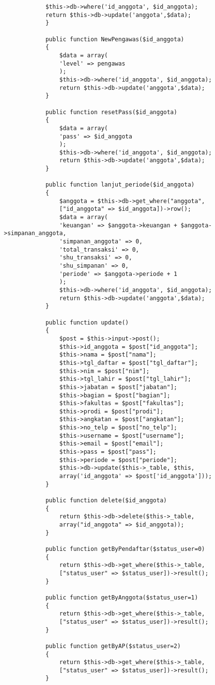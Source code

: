 \begin{verbatim}
			$this->db->where('id_anggota', $id_anggota);
			return $this->db->update('anggota',$data);
			}
			
			public function NewPengawas($id_anggota)
			{
				$data = array(
				'level' => pengawas
				);
				$this->db->where('id_anggota', $id_anggota);
				return $this->db->update('anggota',$data);
			}
			
			public function resetPass($id_anggota)
			{
				$data = array(
				'pass' => $id_anggota
				);
				$this->db->where('id_anggota', $id_anggota);
				return $this->db->update('anggota',$data);
			}
			
			public function lanjut_periode($id_anggota)
			{
				$anggota = $this->db->get_where("anggota", 
				["id_anggota" => $id_anggota])->row();
				$data = array(
				'keuangan' => $anggota->keuangan + $anggota->simpanan_anggota,
				'simpanan_anggota' => 0,
				'total_transaksi' => 0,
				'shu_transaksi' => 0,
				'shu_simpanan' => 0,
				'periode' => $anggota->periode + 1
				);
				$this->db->where('id_anggota', $id_anggota);
				return $this->db->update('anggota',$data);
			}
			
			public function update()
			{
				$post = $this->input->post();
				$this->id_anggota = $post["id_anggota"];
				$this->nama = $post["nama"];
				$this->tgl_daftar = $post["tgl_daftar"];
				$this->nim = $post["nim"];
				$this->tgl_lahir = $post["tgl_lahir"];
				$this->jabatan = $post["jabatan"];
				$this->bagian = $post["bagian"];
				$this->fakultas = $post["fakultas"];
				$this->prodi = $post["prodi"];
				$this->angkatan = $post["angkatan"];
				$this->no_telp = $post["no_telp"];
				$this->username = $post["username"];
				$this->email = $post["email"];
				$this->pass = $post["pass"];
				$this->periode = $post["periode"];
				$this->db->update($this->_table, $this, 
				array('id_anggota' => $post['id_anggota']));
			}
			
			public function delete($id_anggota)
			{
				return $this->db->delete($this->_table, 
				array("id_anggota" => $id_anggota));
			}
			
			public function getByPendaftar($status_user=0)
			{
				return $this->db->get_where($this->_table, 
				["status_user" => $status_user])->result();
			}
			
			public function getByAnggota($status_user=1)
			{
				return $this->db->get_where($this->_table, 
				["status_user" => $status_user])->result();
			}
			
			public function getByAP($status_user=2)
			{
				return $this->db->get_where($this->_table, 
				["status_user" => $status_user])->result();
			}
			

\end{verbatim}
